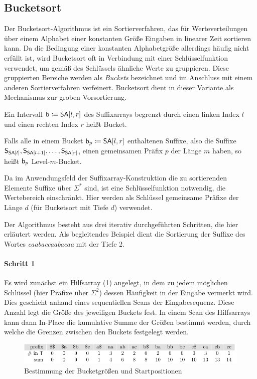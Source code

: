 \subsection{Bucketsort}
\label{section:bucketsort}

Der  Bucketsort-Algorithmus \cite[Kapitel 8.2 (dort unter dem Namen \emph{counting sort})]{Cormen2009} ist ein Sortierverfahren, das für Werteverteilungen über einem Alphabet einer konstanten Größe Eingaben in linearer Zeit sortieren kann. Da die Bedingung einer konstanten Alphabetgröße allerdings häufig nicht erfüllt ist, wird Bucketsort oft in Verbindung mit einer Schlüsselfunktion verwendet, um gemäß des Schlüssels \glqq ähnliche\grqq{} Werte zu gruppieren. Diese gruppierten Bereiche werden als \emph{Buckets} bezeichnet und im Anschluss mit einem anderen Sortierverfahren verfeinert. Bucketsort dient in dieser Variante als Mechanismus zur groben Vorsortierung.\par
\begin{definition}[Bucket]
	\label{def:bucket}
	Ein Intervall \(\bucket{} \coloneqq \sa[l, r]\) des Suffixarrays begrenzt durch einen linken Index \(l\) und einen rechten Index \(r\) heißt Bucket.\par
    Falls alle in einem Bucket \(\bucket{p} \coloneqq \sa[l, r]\) enthaltenen Suffixe, also die Suffixe \(\suffix{\sa[l]}, \suffix{\sa[l+1]}, \ldots, \suffix{\sa[r]}\), einen gemeinsamen Präfix \(p\) der Länge \(m\) haben, so heißt \(\mathsf{b}_{p}\) Level-\(m\)-Bucket.
\end{definition}
Da im Anwendungsfeld der Suffixarray-Konstruktion die zu sortierenden Elemente Suffixe über \(\Sigma^\ast\) sind, ist eine Schlüsselfunktion notwendig, die Wertebereich einschränkt. Hier werden als Schlüssel gemeinsame Präfixe der Länge \(d\) (für Bucketsort mit Tiefe \(d\)) verwendet.\par
Der Algorithmus besteht aus drei iterativ durchgeführten Schritten, die hier erläutert werden. Als begleitendes Beispiel dient die Sortierung der Suffixe des Wortes \emph{caabaccaabacaa} mit der Tiefe 2.
\paragraph{Schritt 1}
Es wird zunächst ein Hilfsarray (\cref{bucketsort:bkt}) angelegt, in dem zu jedem möglichen Schlüssel (hier Präfixe über \(\Sigma^2\)) dessen Häufigkeit in der Eingabe vermerkt wird. Dies geschieht anhand eines sequentiellen Scans der Eingabesequenz. Diese Anzahl legt die Größe des jeweiligen Buckets fest. In einem Scan des Hilfsarrays kann dann In-Place die kumulative Summe der Größen bestimmt werden, durch welche die Grenzen zwischen den Buckets festgelegt werden.
\begin{figure}[ht]
    \includegraphics[width=\textwidth]{kapitel/komponenten/sortieralgorithmen/bucketsort/step_01/bkt/image.pdf}
    \caption{Bestimmung der Bucketgrößen und Startpositionen}
    \label{bucketsort:bkt}
\end{figure}
